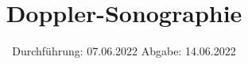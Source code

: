 

\subject{VERSUCH US3}
\title{Doppler-Sonographie}
\date{%
  Durchführung: 07.06.2022
  \hspace{3em}
  Abgabe: 14.06.2022
}



\maketitle
\thispagestyle{empty}
\tableofcontents
\newpage





\printbibliography{}




